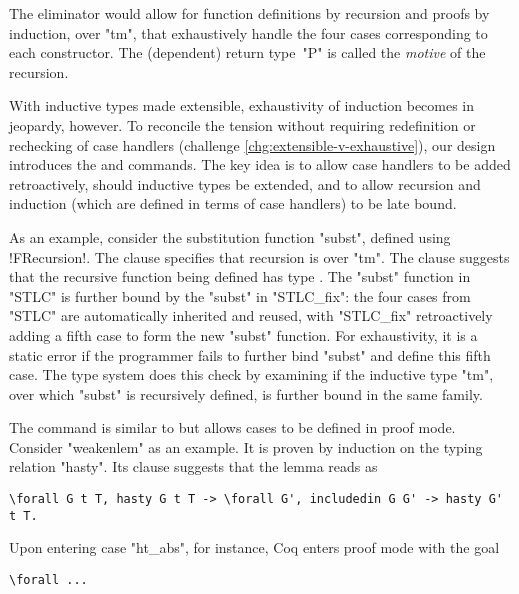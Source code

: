 \noindent
The eliminator would allow for function definitions by recursion
and proofs by induction, over "tm", that exhaustively
handle the four cases corresponding to each constructor.
The (dependent) return type~"P" is called the \emph{motive} of the recursion.

With inductive types made extensible, exhaustivity of induction becomes
in jeopardy, however.
To reconcile the tension without requiring redefinition or rechecking of
case handlers (challenge \ref{chg:extensible-v-exhaustive}),
our design introduces the  and  commands.
The key idea is to allow case handlers to be added retroactively, should
inductive types be extended, and to allow recursion and induction (which are defined in terms of case handlers) to be late bound.

As an example, consider the substitution function "subst", defined using
\lsti!FRecursion!.
The  clause specifies that recursion is over "tm".
The  clause suggests that the recursive function being
defined has type .
%
The "subst" function in "STLC" is further bound by the "subst" in "STLC_fix":
the four cases from "STLC" are automatically inherited and reused,
with "STLC_fix" retroactively adding a fifth case to form the new "subst" function.
%
For exhaustivity, it is a static error if the programmer fails to
further bind "subst" and define this fifth case.
The type system does this check by examining if the inductive type "tm",
over which "subst" is recursively defined, is further bound in the same family.

The  command is similar to  but
allows cases to be defined in proof mode.
Consider "weakenlem" as an example.
It is proven by induction on the typing relation "hasty".
Its  clause suggests that the lemma reads as

\begin{lstlisting}[basicstyle=\fontsize{8}{9}\ttfamily]
\forall G t T, hasty G t T -> \forall G', includedin G G' -> hasty G' t T.
\end{lstlisting}

\noindent
Upon entering case "ht_abs", for instance, Coq enters proof mode with the goal

\begin{lstlisting}[basicstyle=\fontsize{8}{9}\ttfamily]
  \forall ...
\end{lstlisting}

